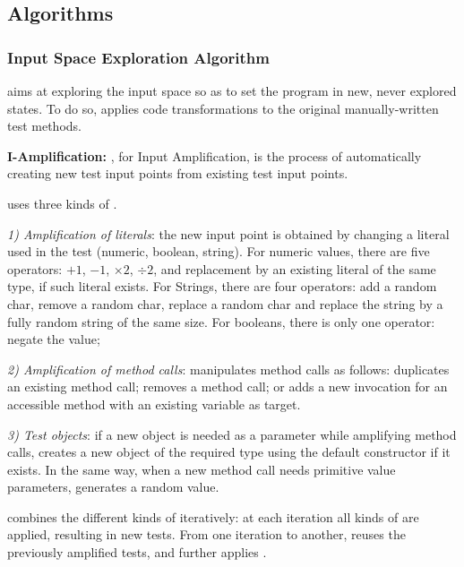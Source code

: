 \subsection{Algorithms}

\subsubsection{Input Space Exploration Algorithm}
\label{subsec:input-space-exploration}

\dspot aims at exploring the input space so as to set the program in new, never explored states. To do so, \dspot applies code transformations to the original manually-written test methods. 

\textbf{I-Amplification:} \Iampl, for Input Amplification, is the process of automatically creating new test input points from existing test input points.

\dspot uses three kinds of \Iampl.

\emph{1) Amplification of literals}: the new input point is obtained by changing a literal used in the test (numeric, boolean, string).
For numeric values, there are five operators: $+1$, $-1$, $\times 2$, $ \div 2$, and replacement by an existing literal of the same type, if such literal exists.
For Strings, there are four operators: add a random char, remove a random char, replace a random char and replace the string by a fully random string of the same size.
For booleans, there is only one operator: negate the value;

\emph{2) Amplification of method calls}: \dspot manipulates method calls as follows:
\dspot duplicates an existing method call; removes a method call;
or adds a new invocation for an accessible method with an existing variable as target.

\emph{3) Test objects}:
if a new object is needed as a parameter while amplifying method calls, \dspot creates a new object of the required type using the default constructor if it exists.
In the same way, when a new method call needs primitive value parameters, \dspot generates a random value.

\dspot combines the different kinds of \Iampl iteratively: at each iteration all kinds of \Iampl are applied, resulting in new tests. 
From one iteration to another, \dspot reuses the previously amplified tests, and further applies \Iampl{}.

